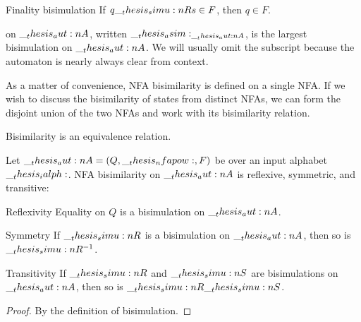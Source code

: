 \begin{definition}
\begin{thmdescription}
  \item[Finality bisimulation]
    If $q \__thesis_simu:n {R} s \in F$, then $q \in F$.
  \end{thmdescription}
   on $\__thesis_aut:n {A}$, written $\__thesis_asim:_{\__thesis_aut:n {A}}$, is the largest bisimulation on $\__thesis_aut:n {A}$.
  We will usually omit the subscript because the automaton is nearly always clear from context.
\end{definition}

As a matter of convenience, \ac{NFA} bisimilarity is defined on a single \ac{NFA}.
If we wish to discuss the bisimilarity of states from distinct \acp{NFA}, we can form the disjoint union of the two \acp{NFA} and work with its bisimilarity relation.

Bisimilarity is an equivalence relation.
\begin{theorem}\label{thm:nfa-bisim-equiv}
  Let $\__thesis_aut:n {A} = (Q, \__thesis_nfapow:, F)$ be  over an input alphabet $\__thesis_ialph:$.
  \Ac{NFA} bisimilarity on $\__thesis_aut:n {A}$ is reflexive, symmetric, and transitive:
  \begin{thmdescription}[nosep]
  \item[Reflexivity] Equality on $Q$ is a bisimulation on $\__thesis_aut:n {A}$.
  \item[Symmetry] If $\__thesis_simu:n {R}$ is a bisimulation on $\__thesis_aut:n {A}$, then so is $\__thesis_simu:n {R}^{-1}$.
  \item[Transitivity] If $\__thesis_simu:n {R}$ and $\__thesis_simu:n {S}$ are bisimulations on $\__thesis_aut:n {A}$, then so is $\__thesis_simu:n {R}\__thesis_simu:n {S}$.
  \end{thmdescription}
\end{theorem}
\begin{proof}
  By the definition of bisimulation.
\end{proof}


